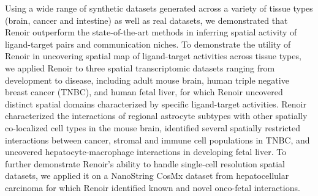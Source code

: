 Using a wide range of synthetic datasets generated across a variety of tissue types (brain, cancer and intestine) as well as real datasets, we demonstrated that Renoir outperform the state-of-the-art methods in inferring spatial activity of ligand-target pairs and communication niches. To demonstrate the utility of Renoir in uncovering spatial map of ligand-target activities across tissue types, we applied Renoir to three spatial transcriptomic datasets ranging from development to disease, including adult mouse brain, human triple negative breast cancer (TNBC), and human fetal liver, for which Renoir uncovered distinct spatial domains characterized by specific ligand-target activities. Renoir characterized the interactions of regional astrocyte subtypes with other spatially co-localized cell types in the mouse brain, identified several spatially restricted interactions between cancer, stromal and immune cell populations in TNBC, and uncovered hepatocyte-macrophage interactions in developing fetal liver. To further demonstrate Renoir's ability to handle single-cell resolution spatial datasets, we applied it on a NanoString CosMx dataset from hepatocellular carcinoma for which Renoir identified known and novel onco-fetal interactions.  
